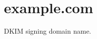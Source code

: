 \hypertarget{example_8com-example}{}\section{example.\+com}
D\+K\+IM signing domain name.

\textquotesingle{}


\begin{DoxyCodeInclude}
\end{DoxyCodeInclude}
 